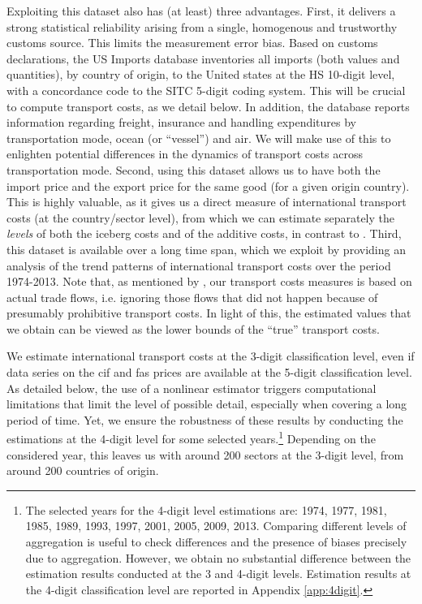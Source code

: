 \documentclass[a4paper,11pt]{article}
\begin{document}
Exploiting this dataset also has (at least) three advantages. First, it delivers a strong statistical reliability arising from a single, homogenous and trustworthy customs source.  This limits the measurement error bias. Based on customs declarations, the US Imports database inventories all imports (both values and quantities), by country of origin, to the United states at the HS 10-digit level, with a concordance code to the SITC 5-digit coding system. This will be crucial to compute transport costs, as we detail below. In addition, the database reports information regarding freight, insurance and handling expenditures by transportation mode, ocean (or ``vessel'') and air. We will make use of this to enlighten potential differences in the dynamics of transport costs across transportation mode. Second, using this dataset allows us to have both the import price and the export price for the same good (for a given origin country). This is highly valuable, as it gives us a direct measure of international transport costs (at the country/sector level), from which we can estimate separately the \textit{levels} of both the iceberg costs and of the additive costs, in contrast to \cite{Irrazabal_2015}. Third, this dataset is available over a long time span, which we exploit by providing an analysis of the trend patterns of international transport costs over the period 1974-2013. Note that, as mentioned by \cite{Lafourcade_Thisse}, our transport costs measures is based on actual trade flows, i.e. ignoring those flows that did not happen because of presumably prohibitive transport costs. In light of this, the estimated values that we obtain can be viewed as the lower bounds of the ``true'' transport costs.\smallskip


We estimate international transport costs at the 3-digit classification level, even if data series on the cif and fas prices are available at the 5-digit classification level. As detailed below, the use of a nonlinear estimator triggers computational limitations that limit the level of possible detail, especially when covering a long period of time. Yet, we ensure the robustness of these results by conducting the estimations at the 4-digit level for some selected years.\footnote{The selected years for the 4-digit level estimations are: 1974, 1977, 1981, 1985, 1989, 1993, 1997, 2001, 2005, 2009, 2013. Comparing different levels of aggregation is useful to check differences and the presence of biases precisely due to aggregation. However, we obtain no substantial difference between the estimation results conducted at the 3 and 4-digit levels. Estimation results at the 4-digit classification level are reported in Appendix \ref{app:4digit}.} Depending on the considered year, this leaves us with around 200 sectors at the 3-digit level, from around 200 countries of origin.
\end{document}
